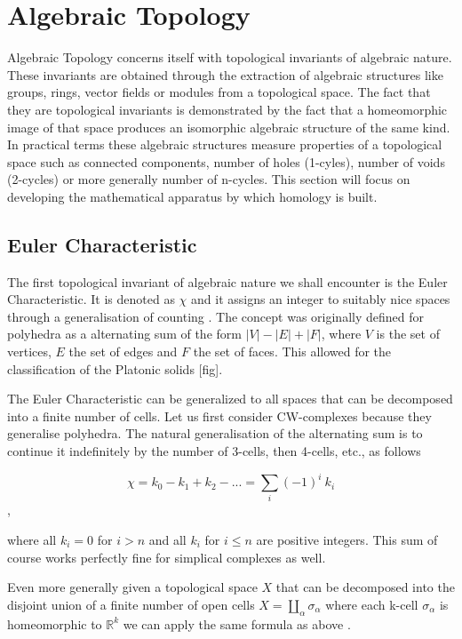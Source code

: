 \section{Algebraic Topology}


Algebraic Topology concerns itself with topological invariants of algebraic nature. These invariants are obtained through the extraction of algebraic structures like groups, rings, vector fields or modules from a topological space. The fact that they are topological invariants is demonstrated by the fact that a homeomorphic image of that space produces an isomorphic algebraic structure of the same kind. In practical terms these algebraic structures measure properties of a topological space such as connected components, number of holes (1-cyles), number of voids (2-cycles) or more generally number of n-cycles. This section will focus on developing the mathematical apparatus by which homology is built.

\subsection{Euler Characteristic}

The first topological invariant of algebraic nature we shall encounter is the Euler Characteristic. It is denoted as $\chi$ and it assigns an integer to suitably nice spaces through a generalisation of counting \cite{elementary-applied-topology}. The concept was originally defined for polyhedra as a alternating sum of the form $|V| - |E| + |F|$, where $V$ is the set of vertices, $E$ the set of edges and $F$ the set of faces. This allowed for the classification of the Platonic solids [fig].


The Euler Characteristic can be generalized to all spaces that can be decomposed into a finite number of cells. Let us first consider CW-complexes because they generalise polyhedra. The natural generalisation of the alternating sum is to continue it indefinitely by the number of 3-cells, then 4-cells, etc., as follows

$$ \chi = k_0 - k_1 + k_2 - ... = \sum_{i}{(-1)^i~k_i}  $$,

where all $k_i = 0$ for $i > n$ and all $k_i$ for $i \le n$ are positive integers. This sum of course works perfectly fine for simplical complexes as well.


Even more generally given a topological space $X$ that can be decomposed into the disjoint union of a finite number of open cells $X = \coprod_{\alpha}\sigma_{\alpha}$ where each k-cell $\sigma_{\alpha}$ is homeomorphic to $\mathbb{R}^k$ we can apply the same formula as above \cite{elementary-applied-topology}. 

